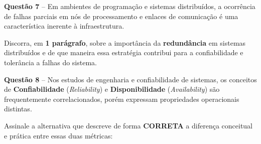 \documentclass[12pt,a4paper]{article}
\newcommand{\resposta}[1]{
\noindent
\framebox[\textwidth]{
\begin{minipage}{0.98\textwidth}
\vspace*{#1}\null
\end{minipage}
}
}
\begin{document}
\vspace{0.5cm}

\textbf{Questão 7} -- Em ambientes de programação e sistemas distribuídos, a ocorrência de falhas parciais em nós de processamento e enlaces de comunicação é uma característica inerente à infraestrutura.

\vspace{0.2cm}

Discorra, em \textbf{1 parágrafo}, sobre a importância da \textbf{redundância} em sistemas distribuídos e de que maneira essa estratégia contribui para a confiabilidade e tolerância a falhas do sistema.

\vspace{0.2cm}

\resposta{3.5cm}

\vspace{0.5cm}

\textbf{Questão 8} -- Nos estudos de engenharia e confiabilidade de sistemas, os conceitos de \textbf{Confiabilidade} (\textit{Reliability}) e \textbf{Disponibilidade} (\textit{Availability}) são frequentemente correlacionados, porém expressam propriedades operacionais distintas.

\vspace{0.2cm}

Assinale a alternativa que descreve de forma \textbf{CORRETA} a diferença conceitual e prática entre essas duas métricas:

\vspace{0.3cm}
\end{document}
